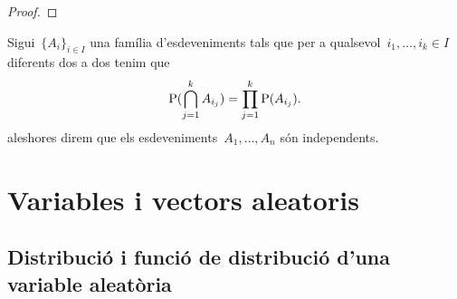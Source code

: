 \documentclass[../../main.tex]{subfiles}
\begin{document}
    \begin{proof}
    \end{proof}
    \begin{definition}
        \label{def:esdeveniments-independents-cas-general}
        Sigui~\(\{A_{i}\}_{i\in I}\) una família d'esdeveniments tals que per a qualsevol~\(i_{1},\dots,i_{k}\in I\) diferents dos a dos tenim que
        \[
            \mathrm{P}(\bigcap_{j=1}^{k}A_{i_{j}})=\prod_{j=1}^{k}\mathrm{P}(A_{i_{j}}).
        \]
        aleshores direm que els esdeveniments~\(A_{1},\dots,A_{n}\) són independents.
    \end{definition}
\chapter{Variables i vectors aleatoris}
\section{Distribució i funció de distribució d'una variable aleatòria}
\end{document}
